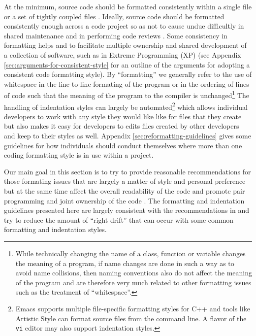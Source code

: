 At the minimum, source code should be formatted consistently within a single
file or a set of tightly coupled files {}\cite[Item 0]{C++CodingStandards05}.
Ideally, source code should be formatted consistently enough across a code
project so as not to cause undue difficultly in shared maintenance and in
performing code reviews {}\cite{CodeComplete2nd04}.  Some consistency in
formatting helps and to facilitate multiple ownership and shared development
of a collection of software, such as in Extreme Programming (XP)
{}\cite{ExtremeProgrammingExplained99} (see Appendix
{}\ref{sec:arguments-for-consistent-style} for an outline of the arguments for
adopting a consistent code formatting style).  By ``formatting'' we generally
refer to the use of whitespace in the line-to-line formating of the program or
in the ordering of lines of code such that the meaning of the program to the
compiler is unchanged\footnote{While technically changing the name of a class,
function or variable changes the meaning of a program, if name changes are
done in such a way as to avoid name collisions, then naming conventions also
do not affect the meaning of the program and are therefore very much related
to other formatting issues such as the treatment of ``whitespace''.}  The
handling of indentation styles can largely be automated\footnote{Emacs
supports multiple file-specific formatting styles for C++ and tools like
Artistic Style {}\cite{ArtisticStyle} can format source files from the command
line.  A flavor of the {}\texttt{vi} editor may also support indentation
styles. } which allows individual developers to work with any style they would
like like for files that they create but also makes it easy for developers to
edits files created by other developers and keep to their styles as well.
Appendix {}\ref{sec:reformatting-guidelines} gives some guidelines for how
individuals should conduct themselves where more than one coding formatting
style is in use within a project.

Our main goal in this section is to try to provide reasonable recommendations
for those formating issues that are largely a matter of style and personal
preference but at the same time affect the overall readability of the code and
promote pair programming and joint ownership of the code
{}\cite{ExtremeProgrammingExplained99}.  The formatting and indentation
guidelines presented here are largely consistent with the recommendations in
{}\cite[Chapter 31]{CodeComplete2nd04} and try to reduce the amount of ``right
drift'' that can occur with some common formatting and indentation styles.

